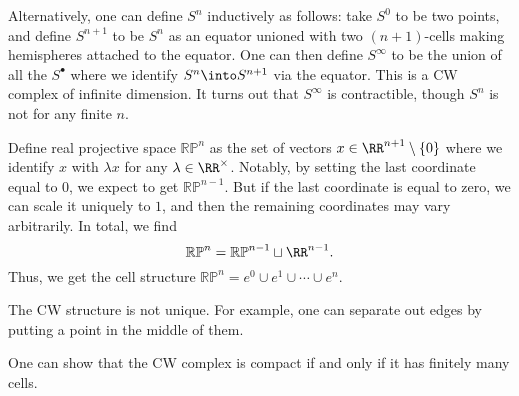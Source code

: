 \documentclass[../notes.tex]{subfiles}
\begin{document}
\begin{example}
	Alternatively, one can define $S^n$ inductively as follows: take $S^0$ to be two points, and define $S^{n+1}$ to be $S^n$ as an equator unioned with two $(n+1)$-cells making hemispheres attached to the equator. One can then define $S^\infty$ to be the union of all the $S^\bullet$ where we identify $S^n\into S^{n+1}$ via the equator. This is a CW complex of infinite dimension. It turns out that $S^\infty$ is contractible, though $S^n$ is not for any finite $n$.
\end{example}
\begin{example}
	Define real projective space $\mathbb{RP}^n$ as the set of vectors $x\in\RR^{n+1}\setminus\{0\}$ where we identify $x$ with $\lambda x$ for any $\lambda\in\RR^\times$. Notably, by setting the last coordinate equal to $0$, we expect to get $\mathbb{RP}^{n-1}$. But if the last coordinate is equal to zero, we can scale it uniquely to $1$, and then the remaining coordinates may vary arbitrarily. In total, we find
	\[\mathbb{RP}^n=\mathbb{RP}^{n-1}\sqcup\RR^{n-1}.\]
	Thus, we get the cell structure $\mathbb{RP}^n=e^0\cup e^1\cup\cdots\cup e^n$.
\end{example}
\begin{remark}
	The CW structure is not unique. For example, one can separate out edges by putting a point in the middle of them.
\end{remark}
One can show that the CW complex is compact if and only if it has finitely many cells.
\end{document}
